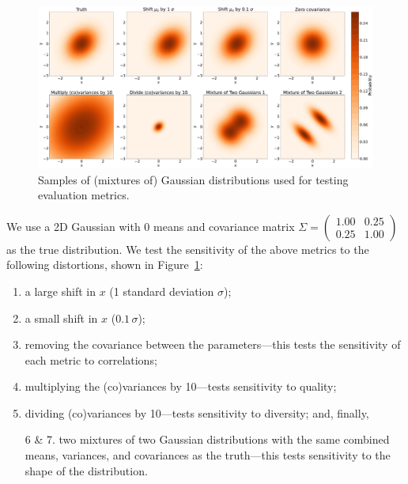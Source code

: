 \begin{figure}[htbp]
    \includegraphics[width=\textwidth]{figures/04-ML4Sim/evaluating/test_dists.pdf}
    \caption{Samples of (mixtures of) Gaussian distributions used for testing evaluation metrics.}
    \label{fig:04_evaluating_toydists}
\end{figure}

\begingroup  %
\setlength{\lineskip}{5pt} 

We use a 2D Gaussian with 0 means and covariance matrix $\Sigma = \left(\begin{smallmatrix}
    1.00 & 0.25 \\ 0.25 & 1.00
\end{smallmatrix}\right)$ as the true distribution.
We test the sensitivity of the above metrics to the following distortions, shown in Figure~\ref{fig:04_evaluating_toydists}:

\endgroup

\begin{enumerate}
    \item a large shift in $x$ (1 standard deviation $\sigma$);
    \item a small shift in $x$ ($0.1\,\sigma$);
    \item removing the covariance between the parameters---this tests the sensitivity of each metric to correlations;
    \item multiplying the (co)variances by 10---tests sensitivity to quality;
    \item dividing (co)variances by 10---tests sensitivity to diversity; and, finally,
    \item[6 \& 7.] two mixtures of two Gaussian distributions with the same combined means, variances, and covariances as the truth---this tests sensitivity to the shape of the distribution.
\end{enumerate}

